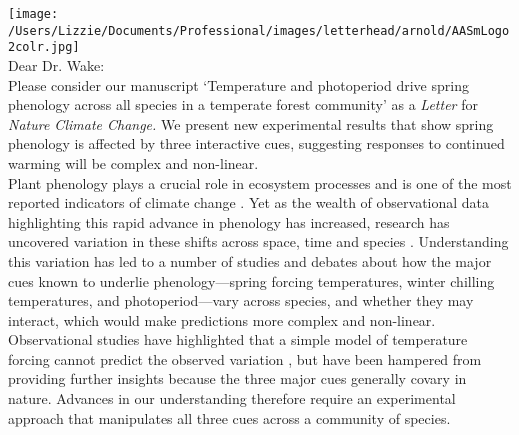 \documentclass[11pt,a4paper]{article}
\begin{document}
\noindent \texttt{[image: /Users/Lizzie/Documents/Professional/images/letterhead/arnold/AASmLogo2colr.jpg]}
\vspace{1ex}\\

\noindent Dear Dr. Wake: %
\vspace{1.5ex}\\
\noindent Please consider our manuscript `Temperature and photoperiod drive spring phenology across all species in a temperate forest community' as a \emph{Letter} for \emph{Nature Climate Change.} We present new experimental results that show spring phenology is affected by three interactive cues, suggesting responses to continued warming will be complex and non-linear.
\vspace{1.5ex}\\
Plant phenology plays a crucial role in ecosystem processes and is one of the most reported indicators of climate change \citep{Cleland:2007aa,piao2017,sippel2016}. Yet as the wealth of observational data highlighting this rapid advance in phenology has increased, research has uncovered variation in these shifts across space, time and species \citep{Rutishauser:2008fu,Wolkovich:2012aa,fu2015}. Understanding this variation has led to a number of studies and debates \citep[e.g.,][]{Korner:2010,Chuine:xb} about how the major cues known to underlie phenology---spring forcing temperatures, winter chilling temperatures, and photoperiod---vary across species, and whether they may interact, which would make predictions more complex and non-linear. Observational studies have highlighted that a simple model of temperature forcing cannot predict the observed variation \citep{Rutishauser:2008fu,fu2015,carter2017}, but have been hampered from providing further insights because the three major cues generally covary in nature. Advances in our understanding therefore require an experimental approach that manipulates all three cues across a community of species. 
\vspace{1.5ex}\\
\end{document}
